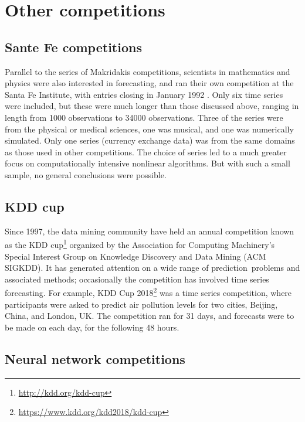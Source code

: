 \documentclass[11pt,a4paper,]{article}
\begin{document}
\hypertarget{other-competitions}{%
\section{Other competitions}\label{other-competitions}}

\hypertarget{sante-fe-competitions}{%
\subsection*{Sante Fe competitions}\label{sante-fe-competitions}}

Parallel to the series of Makridakis competitions, scientists in mathematics and physics were also interested in forecasting, and ran their own competition at the Santa Fe Institute, with entries closing in January 1992 \autocite{WG1993}. Only six time series were included, but these were much longer than those discussed above, ranging in length from 1000 observations to 34000 observations. Three of the series were from the physical or medical sciences, one was musical, and one was numerically simulated. Only one series (currency exchange data) was from the same domains as those used in other competitions. The choice of series led to a much greater focus on computationally intensive nonlinear algorithms. But with such a small sample, no general conclusions were possible.

\hypertarget{kdd-cup}{%
\subsection*{KDD cup}\label{kdd-cup}}

Since 1997, the data mining community have held an annual competition known as the KDD cup\footnote{\url{http://kdd.org/kdd-cup}} organized by the Association for Computing Machinery's Special Interest Group on Knowledge Discovery and Data Mining (ACM SIGKDD). It has generated attention on a wide range of prediction~problems and associated methods; occasionally the competition has involved time series forecasting. For example, KDD Cup 2018\footnote{\url{https://www.kdd.org/kdd2018/kdd-cup}} was a time series competition, where participants were asked to predict air pollution levels for two cities, Beijing, China, and London, UK. The competition ran for 31 days, and forecasts were to be made on each day, for the following 48 hours.

\hypertarget{neural-network-competitions}{%
\subsection*{Neural network competitions}\label{neural-network-competitions}}
\end{document}
